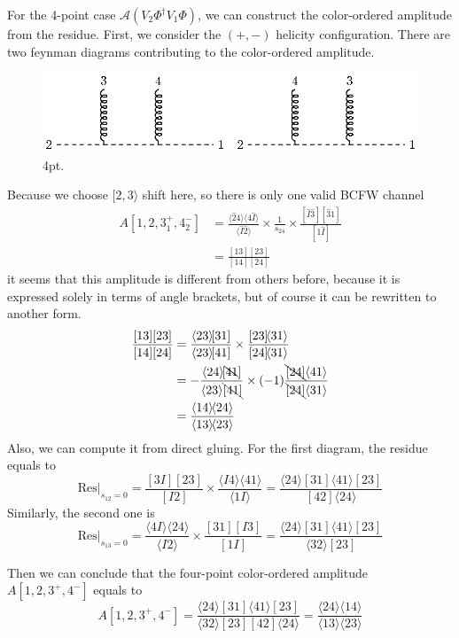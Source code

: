 \documentclass[12pt]{article}
\numberwithin{equation}{section}
\newcommand{\mdavg}[2]{\langle #1 \rangle\!\langle #2 \rangle}
\newcommand{\avg}[1]{\langle #1 \rangle}
\newcommand{\cbrak}[2]{\avg{#1}\![#2]}
\newcommand{\acbrak}[2]{[#1]\!\avg{#2}}
\begin{document}
For the 4-point case $\mathcal{A}(V_2\Phi^\dagger V_1 \Phi )$, we can construct the color-ordered amplitude from the residue. First, we consider the $(+,-)$ helicity
configuration. There are two feynman diagrams contributing to the color-ordered amplitude.\\
\begin{figure}[htbp]
    \centering
    \includegraphics{4pt.eps}
    \caption{4pt.}
    \label{1}
\end{figure}

Because we choose $[2,3\rangle$ shift here, so there is only one valid BCFW channel
\begin{align*}
    A[1,2,3_1^+,4_2^-]&=\frac{\mdavg{\hat{2}4}{4\hat{I}}}{\avg{\hat{I}\hat{2}}}\times\frac{1}{s_{24}}\times\frac{[\hat{I}\hat{3}][\hat{3}1]}{[1\hat{I}]}\\
    &=\frac{[13][23]}{[14][24]}
\end{align*}
it seems that this amplitude is different from others before, because it is expressed solely in terms of angle brackets, but of course it can be rewritten to another form.
\begin{align*}
    \frac{[13][23]}{[14][24]}&=\frac{\cbrak{23}{31}}{\cbrak{23}{41}}\times \frac{\acbrak{23}{31}}{\acbrak{24}{31}}\\
    &=-\frac{\cbrak{24}{\bcancel{41}}}{\avg{23}\bcancel{[41]}}\times(-1)\frac{\bcancel{[24]}\avg{41}}{\bcancel{[24]}\avg{31}}\\
    &=\frac{\mdavg{14}{24}}{\mdavg{13}{23}}
\end{align*}
Also, we can compute it from direct gluing. For the first diagram, the residue equals to
\begin{equation*}
    \mathrm{Res}|_{s_{12}=0}=\frac{[3 I ] [23]}{[I2]}\times \frac{\avg{I4}\avg{41}}{\avg{1I}}=\frac{\avg{24}[31]\avg{41}[23]}{[42]\avg{24}}
\end{equation*}
Similarly, the second one is
\begin{equation*}
    \mathrm{Res}|_{s_{13}=0}=\frac{\avg{4I}\avg{24}}{\avg{I2}}\times \frac{[31] [I3]}{[1I]}=\frac{\avg{24}[31]\avg{41}[23]}{\avg{32}[23]}
\end{equation*}

Then we can conclude that the four-point color-ordered amplitude $A[1,2,3^+,4^-]$ equals to
\begin{equation*}
    A[1,2,3^+,4^-]=\frac{\avg{24}[31]\avg{41}[23]}{\avg{32}[23][42]\avg{24}}=\frac{\avg{24}\avg{14}}{\avg{13}\avg{23}}
\end{equation*}
\end{document}
